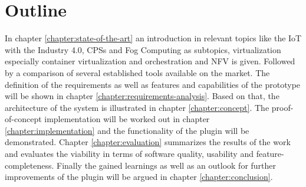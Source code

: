 \section{Outline}
In chapter \ref{chapter:state-of-the-art} an introduction in relevant topics like the \ac{IoT} with the Industry 4.0, \acp{CPS} and Fog Computing as subtopics, virtualization especially container virtualization and orchestration and \ac{NFV} is given.
Followed by a comparison of several established tools available on the market.
The definition of the requirements as well as features and capabilities of the prototype will be shown in chapter \ref{chapter:requirements-analysis}.
Based on that, the architecture of the system is illustrated in chapter \ref{chapter:concept}.
The proof-of-concept implementation will be worked out in chapter \ref{chapter:implementation} and the functionality of the plugin will be demonstrated.
Chapter \ref{chapter:evaluation} summarizes the results of the work and evaluates the viability in terms of software quality, usability and feature-completeness.
Finally the gained learnings as well as an outlook for further improvements of the plugin will be argued in chapter \ref{chapter:conclusion}.


